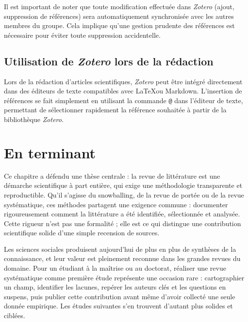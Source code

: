 \documentclass[
  letterpaper,
  DIV=11,
  numbers=noendperiod,
  oneside]{scrreprt}
\begin{document}
Il est important de noter que toute modification effectuée dans
\emph{Zotero} (ajout, suppression de références) sera automatiquement
synchronisée avec les autres membres du groupe. Cela implique qu'une
gestion prudente des références est nécessaire pour éviter toute
suppression accidentelle.

\hypertarget{utilisation-de-zotero-lors-de-la-ruxe9daction}{%
\subsection{\texorpdfstring{Utilisation de \emph{Zotero} lors de la
rédaction}{Utilisation de Zotero lors de la rédaction}}\label{utilisation-de-zotero-lors-de-la-ruxe9daction}}

Lors de la rédaction d'articles scientifiques, \emph{Zotero} peut être
intégré directement dans des éditeurs de texte compatibles avec
\LaTeX ou Markdown. L'insertion de références se fait simplement en
utilisant la commande \texttt{@} dans l'éditeur de texte, permettant de
sélectionner rapidement la référence souhaitée à partir de la
bibliothèque \emph{Zotero}.

\hypertarget{en-terminant-4}{%
\section{En terminant}\label{en-terminant-4}}

Ce chapitre a défendu une thèse centrale : la revue de littérature est
une démarche scientifique à part entière, qui exige une méthodologie
transparente et reproductible. Qu'il s'agisse du snowballing, de la
revue de portée ou de la revue systématique, ces méthodes partagent une
exigence commune : documenter rigoureusement comment la littérature a
été identifiée, sélectionnée et analysée. Cette rigueur n'est pas une
formalité ; elle est ce qui distingue une contribution scientifique
solide d'une simple recension de sources.

Les sciences sociales produisent aujourd'hui de plus en plus de
synthèses de la connaissance, et leur valeur est pleinement reconnue
dans les grandes revues du domaine. Pour un étudiant à la maîtrise ou au
doctorat, réaliser une revue systématique comme première étude
représente une occasion rare : cartographier un champ, identifier les
lacunes, repérer les auteurs clés et les questions en suspens, puis
publier cette contribution avant même d'avoir collecté une seule donnée
empirique. Les études suivantes s'en trouvent d'autant plus solides et
ciblées.
\end{document}
